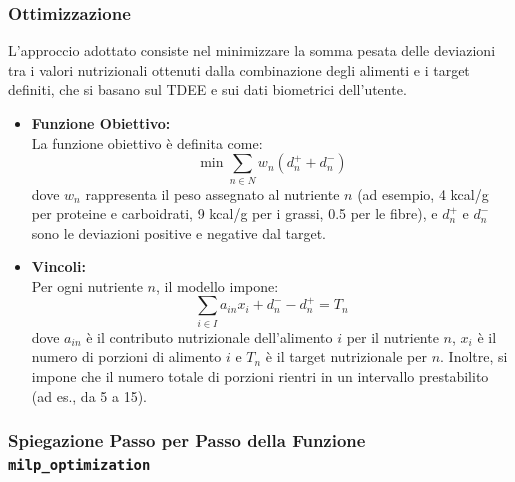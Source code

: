 \documentclass[11pt,a4paper]{article}
\begin{document}
\subsubsection{Ottimizzazione}
L'approccio adottato consiste nel minimizzare la somma pesata delle deviazioni tra i valori nutrizionali ottenuti dalla combinazione degli alimenti e i target definiti, che si basano sul TDEE e sui dati biometrici dell'utente.
\begin{itemize}
    \item \textbf{Funzione Obiettivo:} \\
    La funzione obiettivo è definita come:
    \[
    \min \sum_{n \in N} w_n (d^+_n + d^-_n)
    \]
    dove \(w_n\) rappresenta il peso assegnato al nutriente \(n\) (ad esempio, 4 kcal/g per proteine e carboidrati, 9 kcal/g per i grassi, 0.5 per le fibre), e \(d^+_n\) e \(d^-_n\) sono le deviazioni positive e negative dal target.
    
    \item \textbf{Vincoli:} \\
    Per ogni nutriente \(n\), il modello impone:
    \[
    \sum_{i \in I} a_{in} x_i + d^-_n - d^+_n = T_n
    \]
    dove \(a_{in}\) è il contributo nutrizionale dell'alimento \(i\) per il nutriente \(n\), \(x_i\) è il numero di porzioni di alimento \(i\) e \(T_n\) è il target nutrizionale per \(n\). Inoltre, si impone che il numero totale di porzioni rientri in un intervallo prestabilito (ad es., da 5 a 15).

\end{itemize}

\subsubsection{Spiegazione Passo per Passo della Funzione \texttt{milp\_optimization}}
\end{document}
